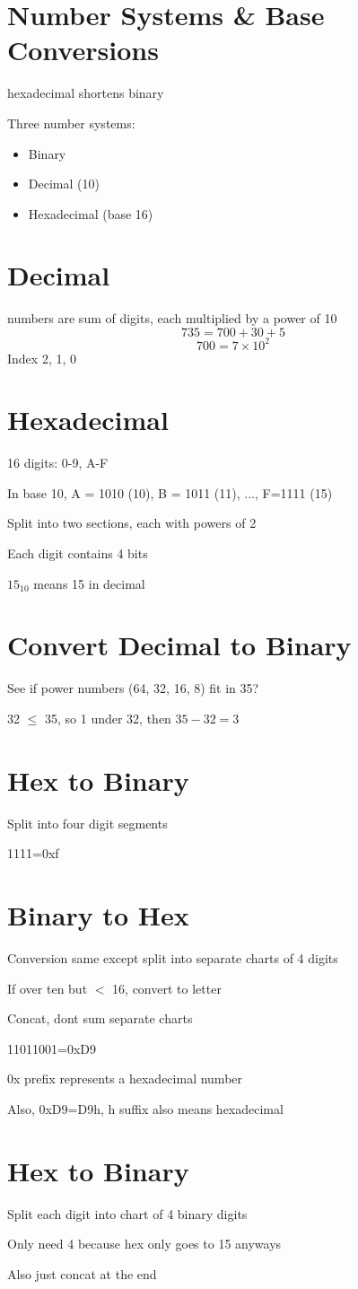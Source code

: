 \documentclass[fleqn]{article}
\begin{document}
\setlength{\mathindent}{0pt}
\section*{Number Systems \& Base Conversions}
hexadecimal shortens binary

Three number systems:
\begin{itemize}
    \item Binary
    \item Decimal (10)
    \item Hexadecimal (base 16)
\end{itemize}

\section*{Decimal}
numbers are sum of digits, each multiplied by a power of 10
\[735 = 700 + 30 + 5\]
\[700 = 7 \times 10^{2}\]
Index 2, 1, 0

\section*{Hexadecimal}
16 digits: 0-9, A-F

In base 10, A = 1010 (10), B = 1011 (11), ..., F=1111 (15)

Split into two sections, each with powers of 2

Each digit contains 4 bits

$ 15 _{10}  $ means 15 in decimal

\section*{Convert Decimal to Binary}
See if power numbers (64, 32, 16, 8) fit in 35?

32 $\leq$ 35, so 1 under 32, then $35-32=3$

\section*{Hex to Binary}
Split into four digit segments

1111=0xf

\section*{Binary to Hex}
Conversion same except split into separate charts of 4 digits

If over ten but $<$ 16, convert to letter

Concat, dont sum separate charts

11011001=0xD9

0x prefix represents a hexadecimal number

Also, 0xD9=D9h, h suffix also means hexadecimal

\section*{Hex to Binary}
Split each digit into chart of 4 binary digits

Only need 4 because hex only goes to 15 anyways

Also just concat at the end
\end{document}
